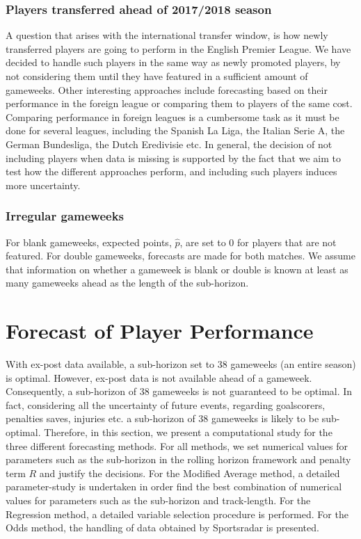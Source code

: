 \subsubsection{Players transferred ahead of 2017/2018 season}
A question that arises with the international transfer window, is how newly transferred players are going to perform in the English Premier League. We have decided to handle such players in the same way as newly promoted players, by not considering them until they have featured in a sufficient amount of gameweeks. Other interesting approaches include forecasting based on their performance in the foreign league or comparing them to players of the same cost. Comparing performance in foreign leagues is a cumbersome task as it must be done for several leagues, including the Spanish La Liga, the Italian Serie A, the German Bundesliga, the Dutch Eredivisie etc. In general, the decision of not including players when data is missing is supported by the fact that we aim to test how the different approaches perform, and including such players induces more uncertainty.


\subsubsection{Irregular gameweeks}
For blank gameweeks, expected points, $\hat{p}$, are set to 0 for players that are not featured. For double gameweeks, forecasts are made for both matches. We assume that information on whether a gameweek is blank or double is known at least as many gameweeks ahead as the length of the sub-horizon.


\section{Forecast of Player Performance}
\label{Exp_setup_Player_Performance_Prediction}


With ex-post data available, a sub-horizon set to 38 gameweeks (an entire season) is optimal. However, ex-post data is not available ahead of a gameweek. Consequently, a sub-horizon of 38 gameweeks is not guaranteed to be optimal. In fact, considering all the uncertainty of future events, regarding goalscorers, penalties saves, injuries etc. a sub-horizon of 38 gameweeks is likely to be sub-optimal. Therefore, in this section, we present a computational study for the three different forecasting methods. For all methods, we set numerical values for parameters such as the sub-horizon in the rolling horizon framework and penalty term $R$ and justify the decisions. For the Modified Average method, a detailed parameter-study is undertaken in order find the best combination of numerical values for parameters such as the sub-horizon and track-length. For the Regression method, a detailed variable selection procedure is performed. For the Odds method, the handling of data obtained by Sportsradar is presented. 

